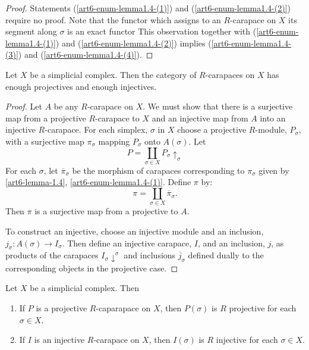 \begin{proof}
Statements (\ref{art6-enum-lemma1.4-(1)}) and (\ref{art6-enum-lemma1.4-(2)}) require no proof. Note that the functor which assigns to an $R$-carapace on $X$ its segment along $\sigma$ is an exact functor This observation together with (\ref{art6-enum-lemma1.4-(1)}) and (\ref{art6-enum-lemma1.4-(2)}) implies (\ref{art6-enum-lemma1.4-(3)}) and (\ref{art6-enum-lemma1.4-(4)}). 
\end{proof}

\begin{prop}\label{art6-prop-1.5}
Let $X$ be a simplicial complex. Then the category of $R$-carapaces on $X$ has enough projectives and enough injectives.
\end{prop}

\begin{proof}
Let $A$ be any $R$-carapace on $X$. We must show that there is a surjective map from a projective $R$-carapace to $X$ and an injective map from $A$ into an injective $R$-carapace. For each simplex, $\sigma$ in $X$ choose a projective $R$-module, $P_{\sigma}$, with a surjective map $\pi_{\sigma}$ mapping $P_{\sigma}$ onto $A(\sigma)$. Let
$$
P = \coprod\limits_{\sigma \in X}P_{\sigma} \uparrow_{\sigma} 
$$
For each $\sigma$, let $\overline{\pi}_{\sigma}$ be the morphism of carapaces corresponding to $\pi_{\sigma}$ given by \ref{art6-lemma-1.4}, \ref{art6-enum-lemma1.4-(1)}. Define $\pi$ by:
$$
\pi = \coprod\limits_{\sigma \in X}\overline{\pi}_{\sigma}.
$$
Then $\pi$ is a surjective map from a projective to $A$.

To construct an injective, choose an injective module and an inclusion, $j_{\sigma}:A(\sigma) \rightarrow I_{\sigma}$. Then define an injective carapace, $I$, and an inclusion, $j$, as products of the carapaces $I_{\sigma} \downarrow^{\sigma}$ and inclusions $\overline{j}_{\sigma}$ defined dually to the corresponding objects in the projective case. 
\end{proof}

\begin{prop}\label{art6-prop-1.6}
Let $X$ be a simplicial complex. Then
    \begin{enumerate}[(1)]
        \item If $P$ is a projective $R$-caparapace on $X$, then $P(\sigma)$ is $R$ projective for each $\sigma\in X$.\label{art6-prop1.6-enum-(1)}
        \item If $I$ is an injective $R$-carapace on $X$, then $I(\sigma)$ is $R$ injective for each $\sigma \in X$.\label{art6-prop1.6-enum-(2)}
    \end{enumerate}
\end{prop}

